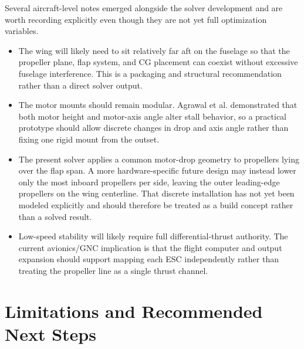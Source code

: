 \documentclass[conf]{new-aiaa}
\begin{document}
Several aircraft-level notes emerged alongside the solver development and are worth recording explicitly even though they are not yet full optimization variables.
\begin{itemize}
\item The wing will likely need to sit relatively far aft on the fuselage so that the propeller plane, flap system, and CG placement can coexist without excessive fuselage interference. This is a packaging and structural recommendation rather than a direct solver output.
\item The motor mounts should remain modular. Agrawal et al. demonstrated that both motor height and motor-axis angle alter stall behavior,\cite{Agrawal2019} so a practical prototype should allow discrete changes in drop and axis angle rather than fixing one rigid mount from the outset.
\item The present solver applies a common motor-drop geometry to propellers lying over the flap span. A more hardware-specific future design may instead lower only the most inboard propellers per side, leaving the outer leading-edge propellers on the wing centerline. That discrete installation has not yet been modeled explicitly and should therefore be treated as a build concept rather than a solved result.
\item Low-speed stability will likely require full differential-thrust authority. The current avionics/GNC implication is that the flight computer and output expansion should support mapping each ESC independently rather than treating the propeller line as a single thrust channel.
\end{itemize}

\section{Limitations and Recommended Next Steps}
\end{document}
